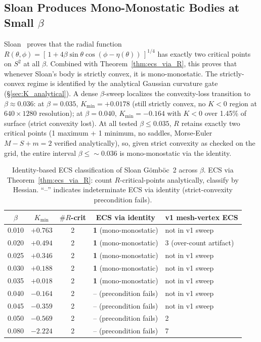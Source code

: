 \documentclass[11pt,a4paper]{article}
\begin{document}
\subsection{Sloan Produces Mono-Monostatic Bodies at Small $\beta$}
\label{sec:sloan_small_beta}

Sloan~\cite{sloan2023} proves that the radial function
$R(\theta,\phi) = [\,1 + 4\beta\sin\theta\cos(\phi - \eta(\theta))\,]^{1/4}$
has exactly two critical points on $S^2$ at all $\beta$. Combined with
Theorem~\ref{thm:ecs_via_R}, this proves that whenever Sloan's body is
strictly convex, it is mono-monostatic. The strictly-convex regime
is identified by the analytical Gaussian curvature gate
(\S\ref{sec:K_analytical}). A dense $\beta$-sweep localizes the
convexity-loss transition to $\beta \approx 0.036$: at $\beta = 0.035$,
$K_{\min} = +0.0178$ (still strictly convex, no $K<0$ region at
$640\times1280$ resolution); at $\beta = 0.040$, $K_{\min} = -0.164$
with $K<0$ over 1.45\% of surface (strict convexity lost). At all
tested $\beta \le 0.035$, $R$ retains exactly two critical points
(1 maximum + 1 minimum, no saddles, Morse-Euler $M-S+m=2$ verified
analytically), so, given strict convexity as checked on the grid, the
entire interval $\beta \le \sim\!0.036$ is mono-monostatic via the
identity.

\begin{table}[h]
\centering
\caption{Identity-based ECS classification of Sloan G\"omb\"oc~2
across $\beta$. ECS via Theorem~\ref{thm:ecs_via_R}: count
$R$-critical-points analytically, classify by Hessian. ``--''
indicates indeterminate ECS via identity (strict-convexity precondition
fails).}
\label{tab:sloan_ecs}
\begin{tabular}{ccccl}
\toprule
$\beta$ & $K_{\min}$ & $\#R$-crit & ECS via identity & v1 mesh-vertex ECS \\
\midrule
0.010 & $+0.763$ & 2 & \textbf{1} (mono-monostatic) & not in v1 sweep \\
0.020 & $+0.494$ & 2 & \textbf{1} (mono-monostatic) & 3 (over-count artifact) \\
0.025 & $+0.346$ & 2 & \textbf{1} (mono-monostatic) & not in v1 sweep \\
0.030 & $+0.188$ & 2 & \textbf{1} (mono-monostatic) & not in v1 sweep \\
0.035 & $+0.018$ & 2 & \textbf{1} (mono-monostatic) & not in v1 sweep \\
0.040 & $-0.164$ & 2 & -- (precondition fails) & not in v1 sweep \\
0.045 & $-0.359$ & 2 & -- (precondition fails) & not in v1 sweep \\
0.050 & $-0.569$ & 2 & -- (precondition fails) & 2 \\
0.080 & $-2.224$ & 2 & -- (precondition fails) & 7 \\
\bottomrule
\end{tabular}
\end{table}
\end{document}
